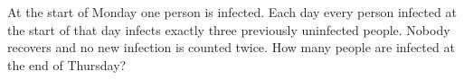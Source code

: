 At the start of Monday one person is infected. Each day every person infected at the start of that day infects exactly three previously uninfected people. Nobody recovers and no new infection is counted twice. How many people are infected at the end of Thursday?
